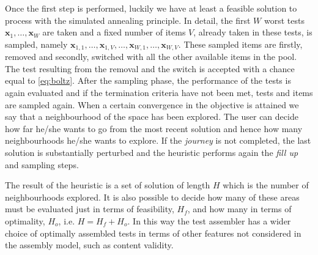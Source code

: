 Once the first step is performed, luckily we have at least a feasible solution to process with the simulated annealing principle. In detail, the first $W$ worst tests $\mathbf{x}_1,\ldots,\mathbf{x}_W$ are taken and a fixed number of items $V$, already taken in these tests, is sampled, namely $\mathbf{x}_{1,1},\ldots,\mathbf{x}_{1,V}, \ldots, \mathbf{x}_{W,1}, \ldots, \mathbf{x}_{W,V} $. These sampled items are firstly, removed and secondly, switched with all the other available items in the pool. The test resulting from the removal and the switch is accepted with a chance equal to \eqref{eq:boltz}. After the sampling phase, the performance of the tests is again evaluated and if the termination criteria have not been met, tests and items are sampled again. When a certain convergence in the objective is attained we say that a neighbourhood of the space has been explored. The user can decide how far he/she wants to go from the most recent solution and hence how many neighbourhoods he/she wants to explore. If the \emph{journey} is not completed, the last solution is substantially perturbed and the heuristic performs again the \emph{fill up} and sampling steps. 

The result of the heuristic is a set of solution of length $H$ which is the number of neighbourhoods explored. It is also possible to decide how many of these areas must be evaluated just in terms of feasibility, $H_f$, and how many in terms of optimality, $H_o$, i.e. $H=H_f+H_o$. In this way the test assembler has a wider choice of optimally assembled tests in terms of other features not considered in the assembly model, such as content validity.

